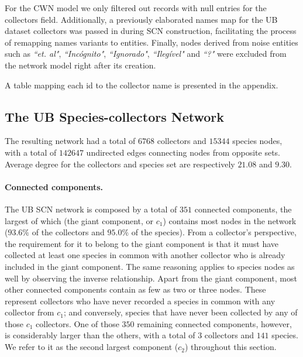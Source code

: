 For the CWN model we only filtered out records with null entries for the collectors field.
Additionally, a previously elaborated names map for the UB dataset collectors was passed in during SCN construction, facilitating the process of remapping names variants to entities. 
Finally, nodes derived from noise entities such as \textit{``et. al"}, \textit{``Incógnito"}, \textit{``Ignorado"}, \textit{``Ilegível"} and \textit{``?"} were excluded from the network model right after its creation.

A table mapping each id to the collector name is presented in the appendix.



\subsection{The UB Species-collectors Network} \label{section:ub_scn}

The resulting network had a total of $6768$ collectors and $15344$ species nodes, with a total of $142647$ undirected edges connecting nodes from opposite sets. 
Average degree for the collectors and species set are respectively $21.08$ and $9.30$.

\paragraph*{Connected components.}
The UB SCN network is composed by a total of $351$ connected components, the largest of which (the giant component, or $c_1$) contains most nodes in the network ($93.6\%$ of the collectors and $95.0\%$ of the species). 
From a collector's perspective, the requirement for it to belong to the giant component is that it must have collected at least one species in common with another collector who is already included in the giant component. The same reasoning applies to species nodes as well by observing the inverse relationship.
Apart from the giant component, most other connected components contain as few as two or three nodes. These represent collectors who have never recorded a species in common with any collector from $c_1$; and conversely, species that have never been collected by any of those $c_1$ collectors.
One of those $350$ remaining connected components, however, is considerably larger than the others, with a total of $3$ collectors and $141$ species. We refer to it as the second largest component ($c_2$) throughout this section.

